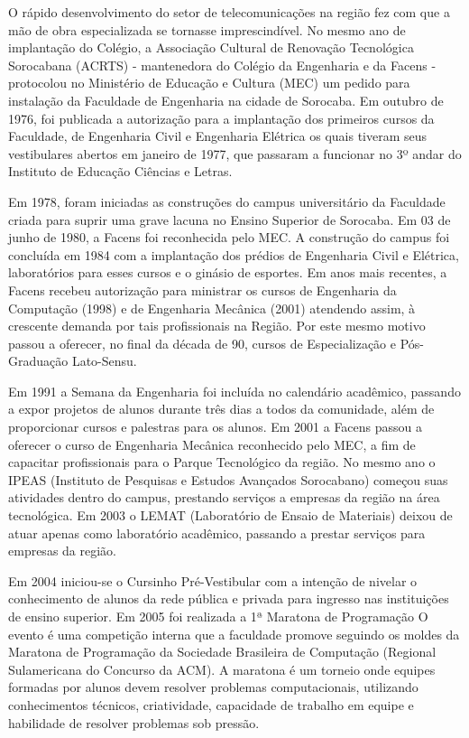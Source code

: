 \documentclass[
	12pt,				%
	oneside,			%
	a4paper,			%
	chapter=TITLE,		%
	section=TITLE,		%
	sumario=tradicional %
	english,			%
	french,				%
	spanish,			%
	brazil				%
	]{abntex2}
\begin{document}
O rápido desenvolvimento do setor de telecomunicações na região fez com que a mão de obra especializada se tornasse imprescindível. No mesmo ano de implantação do Colégio, a Associação Cultural de Renovação Tecnológica Sorocabana (ACRTS) - mantenedora do Colégio da Engenharia e da Facens - protocolou no Ministério de Educação e Cultura (MEC) um pedido para instalação da Faculdade de Engenharia na cidade de Sorocaba. Em outubro de 1976, foi publicada a autorização para a implantação dos primeiros cursos da Faculdade, de Engenharia Civil e Engenharia Elétrica os quais tiveram seus vestibulares abertos em janeiro de 1977, que passaram a funcionar no 3º andar do Instituto de Educação Ciências e Letras.

Em 1978, foram iniciadas as construções do campus universitário da Faculdade criada para suprir uma grave lacuna no Ensino Superior de Sorocaba. Em 03 de junho de 1980, a Facens foi reconhecida pelo MEC. A construção do campus foi concluída em 1984 com a implantação dos prédios de Engenharia Civil e Elétrica, laboratórios para esses cursos e o ginásio de esportes.
Em anos mais recentes, a Facens recebeu autorização para ministrar os cursos de Engenharia da Computação (1998) e de Engenharia Mecânica (2001) atendendo assim, à crescente demanda por tais profissionais na Região. Por este mesmo motivo passou a oferecer, no final da década de 90, cursos de Especialização e Pós-Graduação Lato-Sensu.

Em 1991 a Semana da Engenharia foi incluída no calendário acadêmico, passando a expor projetos de alunos durante três dias a todos da comunidade, além de proporcionar cursos e palestras para os alunos. Em 2001 a Facens passou a oferecer o curso de Engenharia Mecânica reconhecido pelo MEC, a fim de capacitar profissionais para o Parque Tecnológico da região. No mesmo ano o IPEAS (Instituto de Pesquisas e Estudos Avançados Sorocabano) começou suas atividades dentro do campus, prestando serviços a empresas da região na área tecnológica. Em 2003 o LEMAT (Laboratório de Ensaio de Materiais) deixou de atuar apenas como laboratório acadêmico, passando a prestar serviços para empresas da região.

Em 2004 iniciou-se o Cursinho Pré-Vestibular com a intenção de nivelar o conhecimento de alunos da rede pública e privada para ingresso nas instituições de ensino superior. Em 2005 foi realizada a 1ª Maratona de Programação O evento é uma competição interna que a faculdade promove seguindo os moldes da Maratona de Programação da Sociedade Brasileira de Computação (Regional Sulamericana do Concurso da ACM). A maratona é um torneio onde equipes formadas por alunos devem resolver problemas computacionais, utilizando conhecimentos técnicos, criatividade, capacidade de trabalho em equipe e habilidade de resolver problemas sob pressão.
\end{document}
